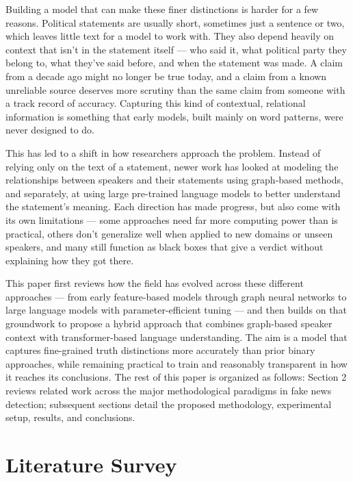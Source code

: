 \documentclass[a4paper,fleqn]{cas-sc}
\begin{document}
Building a model that can make these finer distinctions is harder for a few reasons. Political statements are usually short, sometimes just a sentence or two, which leaves little text for a model to work with. They also depend heavily on context that isn't in the statement itself — who said it, what political party they belong to, what they've said before, and when the statement was made. A claim from a decade ago might no longer be true today, and a claim from a known unreliable source deserves more scrutiny than the same claim from someone with a track record of accuracy. Capturing this kind of contextual, relational information is something that early models, built mainly on word patterns, were never designed to do.

This has led to a shift in how researchers approach the problem. Instead of relying only on the text of a statement, newer work has looked at modeling the relationships between speakers and their statements using graph-based methods, and separately, at using large pre-trained language models to better understand the statement's meaning. Each direction has made progress, but also come with its own limitations — some approaches need far more computing power than is practical, others don't generalize well when applied to new domains or unseen speakers, and many still function as black boxes that give a verdict without explaining how they got there.

This paper first reviews how the field has evolved across these different approaches — from early feature-based models through graph neural networks to large language models with parameter-efficient tuning — and then builds on that groundwork to propose a hybrid approach that combines graph-based speaker context with transformer-based language understanding. The aim is a model that captures fine-grained truth distinctions more accurately than prior binary approaches, while remaining practical to train and reasonably transparent in how it reaches its conclusions. The rest of this paper is organized as follows: Section 2 reviews related work across the major methodological paradigms in fake news detection; subsequent sections detail the proposed methodology, experimental setup, results, and conclusions.

\section{Literature Survey}\label{sec:lit_survey}
\end{document}
